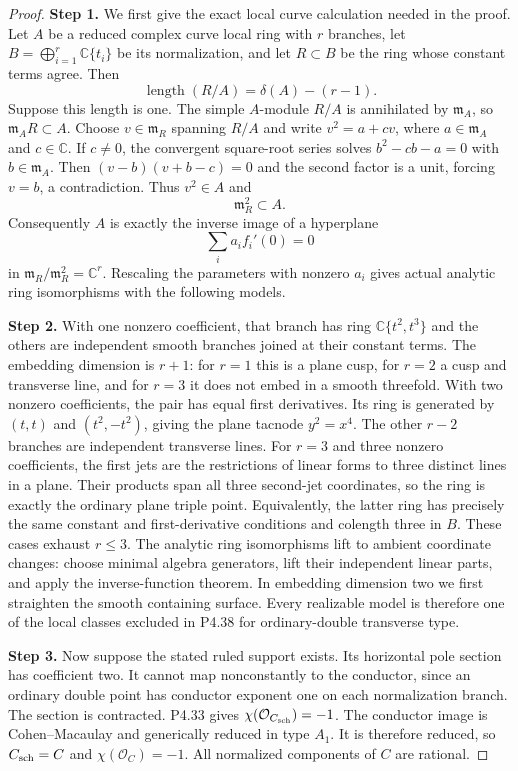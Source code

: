 \begin{proof}
\noindent\textbf{Step 1.} We first give the exact local curve calculation needed in
the proof. Let $A$ be a reduced complex curve local ring with
$r$ branches, let $B=\bigoplus_{i=1}^r\mathbb C\{t_i\}$
be its normalization, and let $R\subset B$ be the ring whose
constant terms agree. Then
\[
 \operatorname{length}(R/A)=\delta(A)-(r-1).
\]
Suppose this length is one. The simple $A$-module $R/A$
is annihilated by $\mathfrak m_A$, so
$\mathfrak m_A R\subset A$. Choose
$v\in\mathfrak m_R$ spanning $R/A$ and write
$v^2=a+cv$, where $a\in\mathfrak m_A$ and $c\in\mathbb C$.
If $c\ne0$, the convergent square-root series solves
$b^2-cb-a=0$ with $b\in\mathfrak m_A$. Then
$(v-b)(v+b-c)=0$ and the second factor is a unit, forcing
$v=b$, a contradiction. Thus $v^2\in A$ and
\[
                         \mathfrak m_R^2\subset A.
\]
Consequently $A$ is exactly the inverse image of a hyperplane
\[
                         \sum_i a_i f_i'(0)=0
\]
in $\mathfrak m_R/\mathfrak m_R^2=\mathbb C^r$.
Rescaling the parameters with nonzero $a_i$ gives actual
analytic ring isomorphisms with the following models.

\noindent\textbf{Step 2.} With one nonzero coefficient, that branch has ring
$\mathbb C\{t^2,t^3\}$ and the others are independent smooth
branches joined at their constant terms. The embedding
dimension is $r+1$: for $r=1$ this is a plane cusp, for
$r=2$ a cusp and transverse line, and for $r=3$ it does
not embed in a smooth threefold. With two nonzero
coefficients, the pair has equal first derivatives. Its
ring is generated by $(t,t)$ and $(t^2,-t^2)$, giving the
plane tacnode $y^2=x^4$. The other $r-2$ branches are
independent transverse lines. For $r=3$ and three nonzero
coefficients, the first jets are the restrictions of linear
forms to three distinct lines in a plane. Their products
span all three second-jet coordinates, so the ring is
exactly the ordinary plane triple point. Equivalently,
the latter ring has precisely the same constant and
first-derivative conditions and colength three in $B$.
These cases exhaust $r\le3$. The analytic ring
isomorphisms lift to ambient coordinate changes: choose
minimal algebra generators, lift their independent linear
parts, and apply the inverse-function theorem. In embedding
dimension two we first straighten the smooth containing
surface. Every realizable model is therefore one of the
local classes excluded in P4.38 for ordinary-double
transverse type.

\noindent\textbf{Step 3.} Now suppose the stated ruled support exists. Its horizontal
pole section has coefficient two. It cannot map
nonconstantly to the conductor, since an ordinary double
point has conductor exponent one on each normalization
branch. The section is contracted. P4.33 gives
$\chi(\mathcal O_{C_{\rm sch}})=-1$.
The conductor image is Cohen--Macaulay and generically
reduced in type $A_1$. It is therefore reduced, so
$C_{\rm sch}=C$ and $\chi(\mathcal O_C)=-1$.
All normalized components of $C$ are rational.


\end{proof}
